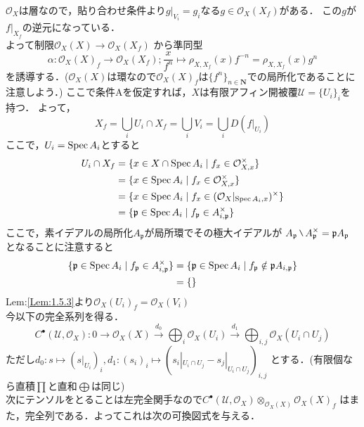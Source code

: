 {$\mathcal{O}_{X}$は層なので，貼り合わせ条件より$g|_{V_{i}} = g_{i}$なる$g\in \mathcal{O}_{X}(X_{f})$がある．
この$g$が$f|_{X_{f}}$の逆元になっている．\\
よって制限$\mathcal{O}_{X}(X)\to \mathcal{O}_{X}(X_{f})$
から準同型
\begin{equation*}
\alpha : \mathcal{O}_{X}(X)_{f}\to \mathcal{O}_{X}(X_{f});\frac{x}{f^n} \mapsto \rho_{X,X_f}(x)f^{-n} = \rho_{X,X_f}(x)g^n
\end{equation*}
を誘導する．($\mathcal{O}_{X}(X)$は環なので$\mathcal{O}_{X}(X)_{f}$は$\{f^{n}\}_{n\in \mathbf{N}}$での局所化であることに注意しよう．)
ここで条件Aを仮定すれば，$X$は有限アフィン開被覆$\mathcal{U} = \{U_{i}\}_{i}$を持つ．
よって，
\begin{equation*}
X_{f} = \bigcup_{i}U_{i}\cap X_{f} = \bigcup_{i}V_{i} = \bigcup_{i}D(f|_{U_{i}})
\end{equation*}
ここで，$U_{i} = \mathrm{Spec}\, A_{i}$とすると
\begin{align*}
  U_{i} \cap X_{f} 
  &= \{x\in X\cap \mathrm{Spec}\, A_{i}\mid f_{x} \in \mathcal{O}_{X,x}^{\times}\}\\
  &= \{x\in \mathrm{Spec}\, A_{i}\mid f_{x} \in \mathcal{O}_{X,x}^{\times}\}\\
  &= \{x\in \mathrm{Spec}\, A_{i}\mid f_{x} \in (\mathcal{O}_{X}|_{\mathrm{Spec}\, A_{i},x})^{\times}\}\\
  &= \{\mathfrak{p}\in \mathrm{Spec}\, A_{i}\mid f_{\mathfrak{p}} \in A_{i,\mathfrak{p}}^{\times}\}
\end{align*}
ここで，素イデアルの局所化$A_{\mathfrak{p}}$が局所環でその極大イデアルが
$A_{\mathfrak{p}}\mysetminus A_{\mathfrak{p}}^{\times} = \mathfrak{p}A_{\mathfrak{p}}$となることに注意すると
\begin{align*}
  \{\mathfrak{p} \in \mathrm{Spec}\, A_{i}\mid f_{\mathfrak{p}}\in A_{i,\mathfrak{p}}^{\times}\}
  &= \{\mathfrak{p} \in \mathrm{Spec}\, A_{i} \mid f_{\mathfrak{p}} \notin \mathfrak{p}A_{i,\mathfrak{p}}\}\\
  &= \{\}
\end{align*}
Lem:\ref{Lem:1.5.3}より$\mathcal{O}_{X}(U_{i})_{f} = \mathcal{O}_{X}(V_{i})$\\
今以下の完全系列を得る．
\begin{equation*}
C^{\bullet}(\mathcal{U},\mathcal{O}_{X}):0 \longrightarrow \mathcal{O}_{X}(X) \stackrel{d_{0}}{\longrightarrow} \bigoplus_{i}\mathcal{O}_{X}(U_{i}) \stackrel{d_{1}}{\longrightarrow} \bigoplus_{i,j}\mathcal{O}_{X}(U_{i} \cap U_{j})
\end{equation*}
ただし$d_{0}:s\mapsto (s|_{U_{i}})_{i},d_{1}:(s_{i})_{i}\mapsto (s_{i}|_{U_{i}\cap U_{j}} - s_{j}|_{U_{i} \cap U_{j}})_{i,j}$
とする．(有限個なら直積$\prod$と直和$\bigoplus$は同じ)\\
次にテンソルをとることは左完全関手なので$C^{\bullet}(\mathcal{U},\mathcal{O}_{X})\otimes_{\mathcal{O}_{X}(X)}\mathcal{O}_{X}(X)_{f}$
はまた，完全列である．よってこれは次の可換図式を与える．

}
